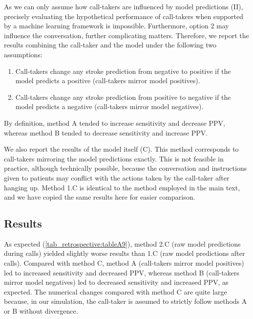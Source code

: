 {As we can only assume how call-takers are influenced by model predictions (II), precisely evaluating the hypothetical performance of call-takers when supported by a machine learning framework is impossible. Furthermore, option 2 may influence the conversation, further complicating matters. Therefore, we report the results combining the call-taker and the model under the following two assumptions:
%
\begin{enumerate}[label=\Alph*.]
    \item Call-takers change any stroke prediction from negative to positive if the model predicts a positive (call-takers mirror model positives).
    \item Call-takers change any stroke prediction from positive to negative if the model predicts a negative (call-takers mirror model negatives).
\end{enumerate}
%
By definition, method A tended to increase sensitivity and decrease PPV, whereas method B tended to decrease sensitivity and increase PPV.

We also report the results of the model itself (C). This method corresponds to call-takers mirroring the model predictions exactly. This is not feasible in practice, although technically possible, because the conversation and instructions given to patients may conflict with the actions taken by the call-taker after hanging up. Method 1.C is identical to the method employed in the main text, and we have copied the same results here for easier comparison.


\subsection{Results}

As expected (\cref{tab_retrospective:tableA9}), method 2.C (raw model predictions during calls) yielded slightly worse results than 1.C (raw model predictions after calls). Compared with method C, method A (call-takers mirror model positives) led to increased sensitivity and decreased PPV, whereas method B (call-takers mirror model negatives) led to decreased sensitivity and increased PPV, as expected. The numerical changes compared with method C are quite large because, in our simulation, the call-taker is assumed to strictly follow methods A or B without divergence.

\begin{sidewaystable}
    \centering
    \caption{Overall performance of model, call-takers and simulated combinations of model and call-takers on MH-1813 test data.}
    \label{tab_retrospective:tableA9}
\end{sidewaystable}}
